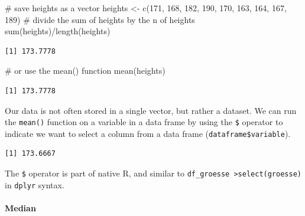 \documentclass[
  letterpaper,
  DIV=11,
  numbers=noendperiod]{scrartcl}
\let\oldparagraph\paragraph
\renewcommand{\paragraph}[1]{\oldparagraph{#1}\mbox{}}
\newenvironment{Shaded}{\begin{snugshade}}{\end{snugshade}}
\newcommand{\CommentTok}[1]{\textcolor[rgb]{0.37,0.37,0.37}{#1}}
\newcommand{\DecValTok}[1]{\textcolor[rgb]{0.68,0.00,0.00}{#1}}
\newcommand{\FunctionTok}[1]{\textcolor[rgb]{0.28,0.35,0.67}{#1}}
\newcommand{\NormalTok}[1]{\textcolor[rgb]{0.00,0.23,0.31}{#1}}
\newcommand{\OtherTok}[1]{\textcolor[rgb]{0.00,0.23,0.31}{#1}}
\newcommand{\SpecialCharTok}[1]{\textcolor[rgb]{0.37,0.37,0.37}{#1}}
\begin{document}
\begin{Shaded}
\begin{Highlighting}[]
\CommentTok{\# save heights as a vector}
\NormalTok{heights }\OtherTok{\textless{}{-}} \FunctionTok{c}\NormalTok{(}\DecValTok{171}\NormalTok{, }\DecValTok{168}\NormalTok{, }\DecValTok{182}\NormalTok{, }\DecValTok{190}\NormalTok{, }\DecValTok{170}\NormalTok{, }\DecValTok{163}\NormalTok{, }\DecValTok{164}\NormalTok{, }\DecValTok{167}\NormalTok{, }\DecValTok{189}\NormalTok{)}
\CommentTok{\# divide the sum of heights by the n of heights}
\FunctionTok{sum}\NormalTok{(heights)}\SpecialCharTok{/}\FunctionTok{length}\NormalTok{(heights)}
\end{Highlighting}
\end{Shaded}

\begin{verbatim}
[1] 173.7778
\end{verbatim}

\begin{Shaded}
\begin{Highlighting}[]
\CommentTok{\# or use the mean() function}
\FunctionTok{mean}\NormalTok{(heights)}
\end{Highlighting}
\end{Shaded}

\begin{verbatim}
[1] 173.7778
\end{verbatim}

Our data is not often stored in a single vector, but rather a dataset.
We can run the \texttt{mean()} function on a variable in a data frame by
using the \texttt{\$} operator to indicate we want to select a column
from a data frame (\texttt{dataframe\$variable}).

\begin{Shaded}
\end{Shaded}

\begin{verbatim}
[1] 173.6667
\end{verbatim}

The \texttt{\$} operator is part of native R, and similar to
\texttt{df\_groesse\ \textbar{}\textgreater{}select(groesse)} in
\texttt{dplyr} syntax.

\hypertarget{median}{%
\paragraph{Median}\label{median}}
\end{document}
